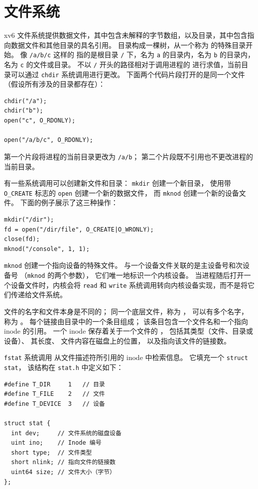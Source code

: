 \section{文件系统}

xv6 文件系统提供数据文件，其中包含未解释的字节数组，以及目录，其中包含指向数据文件和其他目录的具名引用。
目录构成一棵树，从一个称为
的特殊目录开始。
像
\lstinline{/a/b/c}
这样的
指的是根目录
\lstinline{/}
下，名为
\lstinline{a}
的目录内，名为
\lstinline{b}
的目录内，名为
\lstinline{c}
的文件或目录。
不以
\lstinline{/}
开头的路径相对于调用进程的
进行求值，当前目录可以通过
\lstinline{chdir}
系统调用进行更改。
下面两个代码片段打开的是同一个文件（假设所有涉及的目录都存在）：
\begin{lstlisting}[]
chdir("/a");
chdir("b");
open("c", O_RDONLY);

open("/a/b/c", O_RDONLY);
\end{lstlisting}
第一个片段将进程的当前目录更改为
\lstinline{/a/b}；
第二个片段既不引用也不更改进程的当前目录。

有一些系统调用可以创建新文件和目录：
\lstinline{mkdir}
创建一个新目录，
使用带
\lstinline{O_CREATE}
标志的 \lstinline{open}
创建一个新的数据文件，
而
\lstinline{mknod}
创建一个新的设备文件。
下面的例子展示了这三种操作：
\begin{lstlisting}[]
mkdir("/dir");
fd = open("/dir/file", O_CREATE|O_WRONLY);
close(fd);
mknod("/console", 1, 1);
\end{lstlisting}
\lstinline{mknod}
创建一个指向设备的特殊文件。
与一个设备文件关联的是主设备号和次设备号
（\lstinline{mknod}
的两个参数），
它们唯一地标识一个内核设备。
当进程随后打开一个设备文件时，内核会将
\lstinline{read}
和
\lstinline{write}
系统调用转向内核设备实现，而不是将它们传递给文件系统。

文件的名字和文件本身是不同的；
同一个底层文件，称为
，
可以有多个名字，
称为
。
每个链接由目录中的一个条目组成；
该条目包含一个文件名和一个指向 inode 的引用。
一个 inode 保存着关于一个文件的
，
包括其类型（文件、目录或设备）、
其长度、
文件内容在磁盘上的位置，
以及指向该文件的链接数。

\lstinline{fstat}
系统调用
从文件描述符所引用的 inode 中检索信息。
它填充一个
\lstinline{struct}
\lstinline{stat}，
该结构在
\lstinline{stat.h}  中定义如下：
\begin{lstlisting}[]
#define T_DIR     1   // 目录
#define T_FILE    2   // 文件
#define T_DEVICE  3   // 设备

struct stat {
  int dev;     // 文件系统的磁盘设备
  uint ino;    // Inode 编号
  short type;  // 文件类型
  short nlink; // 指向文件的链接数
  uint64 size; // 文件大小（字节）
};
\end{lstlisting}

